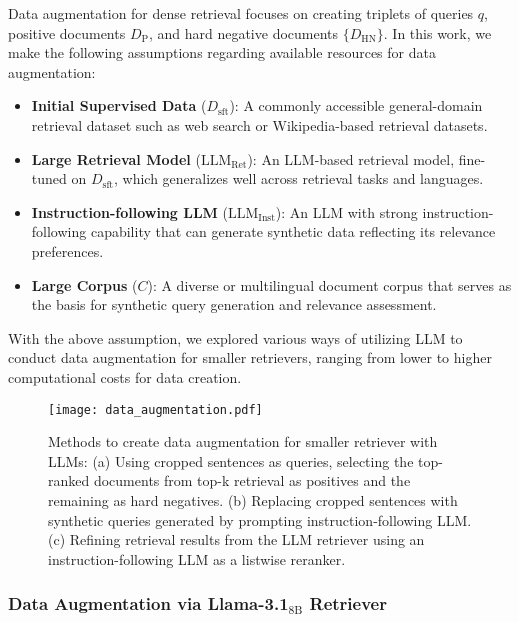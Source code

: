 \documentclass[]{fairmeta}
\begin{document}
Data augmentation for dense retrieval focuses on creating triplets of queries $q$, positive documents $D_\text{P}$, and hard negative documents $\{D_\text{HN}\}$.
In this work, we make the following assumptions regarding available resources for data augmentation:

\begin{itemize}
    \item \textbf{Initial Supervised Data} ($D_{\text{sft}}$): A commonly accessible general-domain retrieval dataset such as web search or Wikipedia-based retrieval datasets.
    \item \textbf{Large Retrieval Model} ($\text{LLM}_{\text{Ret}}$): An LLM-based retrieval model, fine-tuned on $D_{\text{sft}}$, which generalizes well across retrieval tasks and languages.
    \item \textbf{Instruction-following LLM} ($\text{LLM}_{\text{Inst}}$): An LLM with strong instruction-following capability that can generate synthetic data reflecting its relevance preferences.
    \item \textbf{Large Corpus} ($C$): A diverse or multilingual document corpus that serves as the basis for synthetic query generation and relevance assessment.
\end{itemize}

With the above assumption, we explored various ways of utilizing LLM to conduct data augmentation for smaller retrievers, ranging from lower to higher computational costs for data creation.

\begin{figure*}
    \centering
    \texttt{[image: data\_augmentation.pdf]}
    \caption{Methods to create data augmentation for smaller retriever with LLMs: (a) Using cropped sentences as queries, selecting the top-ranked documents from top-k retrieval as positives and the remaining as hard negatives. (b) Replacing cropped sentences with synthetic queries generated by prompting instruction-following LLM. (c) Refining retrieval results from the LLM retriever using an instruction-following LLM as a listwise reranker.}
    \label{fig:paradigm}

\end{figure*}

\subsubsection{Data Augmentation via \texorpdfstring{Llama-3.1$_\text{8B}$}{Llama-3.1-8B} Retriever}
\end{document}
